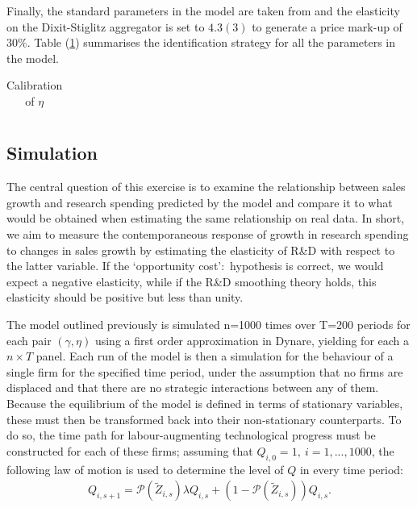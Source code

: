 \documentclass{_latex/house}
\begin{document}
Finally, the standard parameters in the model are taken from \cite{RePEc:red:sed011:21} and the elasticity on the Dixit-Stiglitz aggregator is set to $4.3(3)$ to generate a price mark-up of $30\%$. Table (\ref{tab:table3}) summarises the identification strategy for all the parameters in the model.

\begin{table}[h!tbp]\centering
 \caption{Calibration of $\eta$}
\begin{tabular}{| c | c | c | c | c |}
\hline
\end{tabular} \label{tab:table3}
\end{table}

\subsection{Simulation} \label{simulation}
The central question of this exercise is to examine the relationship between sales growth and research spending predicted by the model and compare it to what would be obtained when estimating the same relationship on real data. In short, we aim to measure the contemporaneous response of growth in research spending to changes in sales growth by estimating the elasticity of R\&D with respect to the latter variable. If the \textquoteleft opportunity cost\textquoteright:\ hypothesis is correct, we would expect a negative elasticity, while if the R\&D smoothing theory holds, this elasticity should be positive but less than unity.

The model outlined previously is simulated n=1000 times over T=200 periods for each pair $(\gamma,\eta)$ using a first order approximation in Dynare, yielding for each a $n\times T$ panel. Each run of the model is then a simulation for the behaviour of a single firm for the specified time period, under the assumption that no firms are displaced and that there are no strategic interactions between any of them. Because the equilibrium of the model is defined in terms of stationary variables, these must then be transformed back into their non-stationary counterparts. To do so, the time path for labour-augmenting technological progress must be constructed for each of these firms; assuming that $Q_{i,0}=1,\: i=1,...,1000$, the following law of motion is used to determine the level of $Q$ in every time period:
\begin{align*}
Q_{i,s+1}=\mathcal{P}\left(\tilde{Z}_{i,s} \right) \lambda Q_{i,s}+(1-\mathcal{P}\left(\tilde{Z}_{i,s} \right))Q_{i,s}.
\end{align*}
\end{document}
